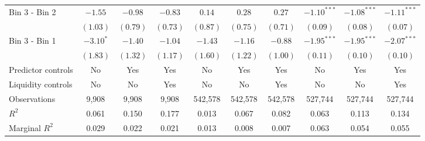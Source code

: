 \begin{tabular}{lccccccccc}
  Bin 3 - Bin 2 & $-1.55$ & $-0.98$ & $-0.83$ & $0.14$ & $0.28$ & $0.27$ & $-1.10^{***}$ & $-1.08^{***}$ & $-1.11^{***}$ \\

   & $(1.03)$ & $(0.79)$ & $(0.73)$ & $(0.87)$ & $(0.75)$ & $(0.71)$ & $(0.09)$ & $(0.08)$ & $(0.07)$ \\

  Bin 3 - Bin 1 & $-3.10^{*}$ & $-1.40$ & $-1.04$ & $-1.43$ & $-1.16$ & $-0.88$ & $-1.95^{***}$ & $-1.95^{***}$ & $-2.07^{***}$ \\

   & $(1.83)$ & $(1.32)$ & $(1.17)$ & $(1.60)$ & $(1.22)$ & $(1.00)$ & $(0.11)$ & $(0.10)$ & $(0.10)$ \\

  \hline

  Predictor controls & No & Yes & Yes & No & Yes & Yes & No & Yes & Yes \\

  Liquidity controls & No & No & Yes & No & No & Yes & No & No & Yes \\

  Observations & 9,908 & 9,908 & 9,908 & 542,578 & 542,578 & 542,578 & 527,744 & 527,744 & 527,744 \\

  $R^2$ & 0.061 & 0.150 & 0.177 & 0.013 & 0.067 & 0.082 & 0.063 & 0.113 & 0.134 \\

  Marginal $R^2$ & 0.029 & 0.022 & 0.021 & 0.013 & 0.008 & 0.007 & 0.063 & 0.054 & 0.055 \\

  \hline

\end{tabular}

